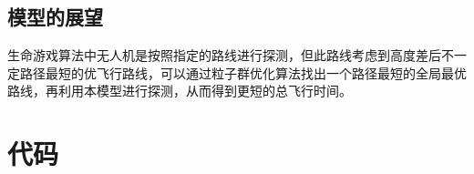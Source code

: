 \documentclass{whutmod}
\begin{document}
	\subsection{模型的展望}
	生命游戏算法中无人机是按照指定的路线进行探测，但此路线考虑到高度差后不一定路径最短的优飞行路线，可以通过粒子群优化算法找出一个路径最短的全局最优路线\parencite{hasanipanah2018feasibility}，再利用本模型进行探测，从而得到更短的总飞行时间。
	
	\newpage	%
	
	\printbibliography[title = {参考文献}]	%
	
	
	\newpage
	\appendix %
\section{代码}
\end{document}
